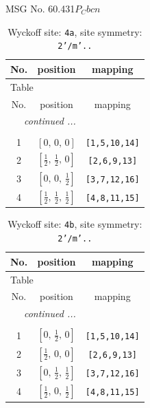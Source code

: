 \documentclass[fleqn,8pt]{jsarticle}
\begin{document}
\setcounter{MaxMatrixCols}{32}

\renewcommand{\tablename}{Table~}
\renewcommand{\figurename}{Figure~}
\begin{center}
\LARGE
MSG No. 60.431\quad$P_{C}bcn$
\end{center}
\renewcommand{\arraystretch}{1.2}
\begin{longtable}{ccc}
\caption{Wyckoff site: {\tt 4a}, site symmetry: {\tt 2'/m'..}}
 \\
 \hline \hline
No. & position & mapping \\ \hline \endfirsthead

\multicolumn{2}{l}{\tablename\ \thetable{}} \\
 \hline \hline
No. & position & mapping \\ \hline \endhead

 \hline \hline
\multicolumn{2}{r}{\footnotesize\it continued ...} \\ \endfoot

 \hline \hline
\multicolumn{2}{r}{} \\ \endlastfoot

1 & $\left[ 0,\, 0,\, 0 \right]$ & {\tt [1,5,10,14]} \\ \hline
2 & $\left[ \frac{1}{2},\, \frac{1}{2},\, 0 \right]$ & {\tt [2,6,9,13]} \\ \hline
3 & $\left[ 0,\, 0,\, \frac{1}{2} \right]$ & {\tt [3,7,12,16]} \\ \hline
4 & $\left[ \frac{1}{2},\, \frac{1}{2},\, \frac{1}{2} \right]$ & {\tt [4,8,11,15]} \\
\end{longtable}
\renewcommand{\arraystretch}{1.2}
\begin{longtable}{ccc}
\caption{Wyckoff site: {\tt 4b}, site symmetry: {\tt 2'/m'..}}
 \\
 \hline \hline
No. & position & mapping \\ \hline \endfirsthead

\multicolumn{2}{l}{\tablename\ \thetable{}} \\
 \hline \hline
No. & position & mapping \\ \hline \endhead

 \hline \hline
\multicolumn{2}{r}{\footnotesize\it continued ...} \\ \endfoot

 \hline \hline
\multicolumn{2}{r}{} \\ \endlastfoot

1 & $\left[ 0,\, \frac{1}{2},\, 0 \right]$ & {\tt [1,5,10,14]} \\ \hline
2 & $\left[ \frac{1}{2},\, 0,\, 0 \right]$ & {\tt [2,6,9,13]} \\ \hline
3 & $\left[ 0,\, \frac{1}{2},\, \frac{1}{2} \right]$ & {\tt [3,7,12,16]} \\ \hline
4 & $\left[ \frac{1}{2},\, 0,\, \frac{1}{2} \right]$ & {\tt [4,8,11,15]} \\
\end{longtable}
\end{document}
